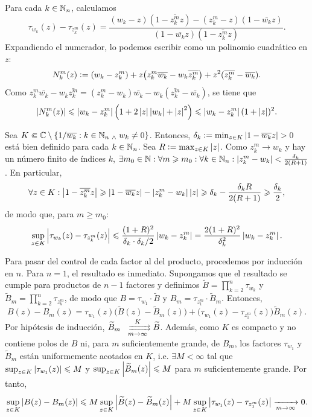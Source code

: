 \begin{dem}
    Para cada $k \in \mathbb{N}_n$, calculamos
    \[
    \tau_{w_k}(z) - \tau_{z_k^m}(z) = \frac{\left(w_k - z\right)\left(1 - \bar{z_k^m}z\right) - \left(z_k^m - z\right)\left(1 - \bar{w_k}z\right)}{\left(1 - \bar{w_k}z\right)\left(1 - \bar{z_k^m}z\right)}.
    \]
    Expandiendo el numerador, lo podemos escribir como un polinomio cuadrático en $z$:
    \[
    N_k^m(z) \vcentcolon= (w_k - z_k^m) + z\bigl(z_k^m \overline{w_k} - w_k \overline{z_k^m}\bigr) + z^2(\overline{z_k^m} - \overline{w_k}).
    \]
    Como $z_k^m \bar{w_k} - w_k \bar{z_k^m} = (z_k^m - w_k)\bar{w_k} - w_k(\bar{z_k^m} - \bar{w_k})$, se tiene que
    \[
    \left|N_k^m(z)\right| \leqslant \left|w_k - z_k^m\right|\left(1 + 2\left|z\right|\left|w_k\right| + \left|z\right|^2\right) \leqslant \left|w_k - z_k^m\right|(1 + \left|z\right|)^2.
    \]

    Sea $K \Subset \mathbb{C} \setminus \left\{1/\overline{w_k} : k \in \mathbb{N}_n \; _{\wedge} \; w_k \neq 0\right\}$. Entonces, $\delta_k \vcentcolon= \min_{z \in K} \left|1 - \overline{w_k}z\right| > 0$ está bien definido para cada $k \in \mathbb{N}_n$. Sea $R \vcentcolon= \max_{z \in K} \left|z\right|$. Como $z_k^m \to w_k$ y hay un número finito de índices $k$, $\exists m_0 \in \mathbb{N} : \forall m \geqslant m_0 : \forall k \in \mathbb{N}_n : \left|z_k^m - w_k\right| < \frac{\delta_k}{2(R + 1)}$. En particular,
    \[
    \forall z \in K : \left|1 - \overline{z_k^m}z\right| \geqslant \left|1 - \overline{w_k}z\right| - \left|z_k^m - w_k\right|\left|z\right| \geqslant \delta_k - \frac{\delta_k R}{2(R+1)} \geqslant \frac{\delta_k}{2},
    \]
    de modo que, para $m \geq m_0$:
    \[
    \sup_{z \in K} \left|\tau_{w_k}(z) - \tau_{z_k^m}(z)\right| \leqslant \frac{(1+R)^2}{\delta_k \cdot \delta_k / 2} \left|w_k - z_k^m\right| = \frac{2(1+R)^2}{\delta_k^2} \left|w_k - z_k^m\right|.
    \]

    Para pasar del control de cada factor al del producto, procedemos por inducción en $n$. Para $n = 1$, el resultado es inmediato. Supongamos que el resultado se cumple para productos de $n - 1$ factores y definimos $\widetilde{B} = \prod_{k=2}^n \tau_{w_k}$ y $\widetilde{B}_m = \prod_{k=2}^n \tau_{z_k^m}$, de modo que $B = \tau_{w_1} \cdot \widetilde{B}$ y $B_m = \tau_{z_1^m} \cdot \widetilde{B}_m$. Entonces,
    \[
    B(z) - B_m(z) = \tau_{w_1}(z) \bigl(\widetilde{B}(z) - \widetilde{B}_m(z)\bigr) + \bigl(\tau_{w_1}(z) - \tau_{z_1^m}(z)\bigr) \widetilde{B}_m(z).
    \]
    Por hipótesis de inducción, $\widetilde{B}_m \xrightrightarrows[m \to \infty]{K} \widetilde{B}$. Además, como $K$ es compacto y no contiene polos de $B$ ni, para $m$ suficientemente grande, de $B_m$, los factores $\tau_{w_1}$ y $\widetilde{B}_m$ están uniformemente acotados en $K$, i.e. $\exists M < \infty$ tal que $\sup_{z \in K} \left|\tau_{w_1}(z)\right| \leqslant M$ y $\sup_{z \in K} \left|\widetilde{B}_m(z)\right| \leqslant M$ para $m$ suficientemente grande. Por tanto,
    \[
    \sup_{z \in K} \left|B(z) - B_m(z)\right| \leqslant M \sup_{z \in K} \left|\widetilde{B}(z) - \widetilde{B}_m(z)\right| + M \sup_{z \in K} \left|\tau_{w_1}(z) - \tau_{z_1^m}(z)\right| \xrightarrow[m \to \infty]{} 0.
    \]

    \vspace{-\baselineskip}
    \hfill\qedsymbol
\end{dem}

